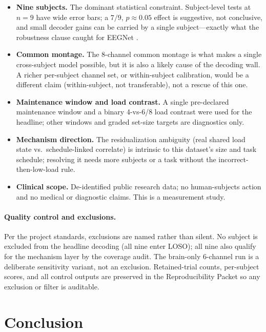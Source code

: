 \documentclass[11pt]{article}
\begin{document}
\begin{itemize}[nosep]
  \item \textbf{Nine subjects.} The dominant statistical constraint. Subject-level tests at $n=9$
  have wide error bars; a $7/9$, $p\approx0.05$ effect is suggestive, not conclusive, and small
  decoder gains can be carried by a single subject---exactly what the robustness clause caught for
  EEGNet \cite{varoquaux2016assessing}.
  \item \textbf{Common montage.} The 8-channel common montage is what makes a single cross-subject
  model possible, but it is also a likely cause of the decoding wall. A richer per-subject channel
  set, or within-subject calibration, would be a different claim (within-subject, not transferable),
  not a rescue of this one.
  \item \textbf{Maintenance window and load contrast.} A single pre-declared maintenance window and
  a binary 4-vs-6/8 load contrast were used for the headline; other windows and graded set-size
  targets are diagnostics only.
  \item \textbf{Mechanism direction.} The residualization ambiguity (real shared load state vs.\
  schedule-linked correlate) is intrinsic to this dataset's size and task schedule; resolving it
  needs more subjects or a task without the incorrect-then-low-load rule.
  \item \textbf{Clinical scope.} De-identified public research data; no human-subjects action and no
  medical or diagnostic claims. This is a measurement study.
\end{itemize}

\paragraph{Quality control and exclusions.} Per the project standards, exclusions are named rather
than silent. No subject is excluded from the headline decoding (all nine enter LOSO); all nine also
qualify for the mechanism layer by the coverage audit. The brain-only 6-channel run is a deliberate
sensitivity variant, not an exclusion. Retained-trial counts, per-subject scores, and all control
outputs are preserved in the Reproducibility Packet so any exclusion or filter is auditable.

\section{Conclusion}
\label{sec:conclusion}
\end{document}

